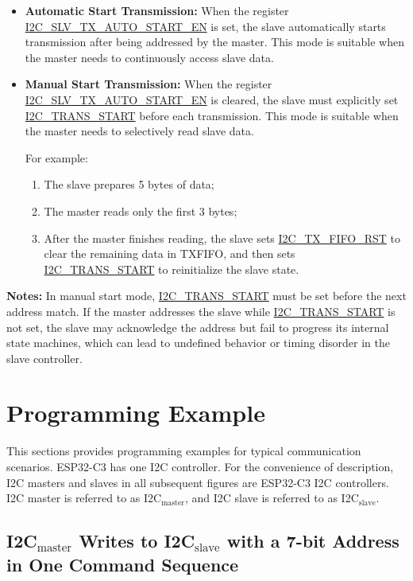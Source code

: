 \documentclass[main\_\_EN.tex]{subfiles}
\begin{document}
\begin{itemize}
  \item \textbf{Automatic Start Transmission:}
  When the register \hyperref[fielddesc:I2CSLVTXAUTOSTARTEN]{I2C\_SLV\_TX\_AUTO\_START\_EN} is set, the slave automatically starts transmission after being addressed by the master.
  This mode is suitable when the master needs to continuously access slave data.

  \item \textbf{Manual Start Transmission:}
  When the register \hyperref[fielddesc:I2CSLVTXAUTOSTARTEN]{I2C\_SLV\_TX\_AUTO\_START\_EN} is cleared, the slave must explicitly set \hyperref[fielddesc:I2CTRANSSTART]{I2C\_TRANS\_START} before each transmission.
  This mode is suitable when the master needs to selectively read slave data.

  For example:
  \begin{enumerate}
    \item The slave prepares 5 bytes of data;
    \item The master reads only the first 3 bytes;
    \item After the master finishes reading, the slave sets \hyperref[fielddesc:I2CTXFIFORST]{I2C\_TX\_FIFO\_RST} to clear the remaining data in TXFIFO, and then sets \hyperref[fielddesc:I2CTRANSSTART]{I2C\_TRANS\_START} to reinitialize the slave state.
  \end{enumerate}
\end{itemize}

{\bfseries Notes:}
In manual start mode, \hyperref[fielddesc:I2CTRANSSTART]{I2C\_TRANS\_START} must be set before the next address match. If the master addresses the slave while \hyperref[fielddesc:I2CTRANSSTART]{I2C\_TRANS\_START} is not set, the slave may acknowledge the address but fail to progress its internal state machines, which can lead to undefined behavior or timing disorder in the slave controller.

\section{Programming Example}
This sections provides programming examples for typical communication scenarios. ESP32-C3 has one I2C controller. For the convenience of description, I2C masters and slaves in all subsequent figures are ESP32-C3 I2C controllers. I2C master is referred to as I2C$_\text{master}$, and I2C slave is referred to as I2C$_\text{slave}$.

\subsection{\texorpdfstring{I2C$_\text{master}$ Writes to I2C$_\text{slave}$ with a 7-bit Address in One Command Sequence}{I2C master Writes to I2C slave with a 7-bit Address in One Command Sequence}}\label{subsec:i2c-mws7}
\end{document}
